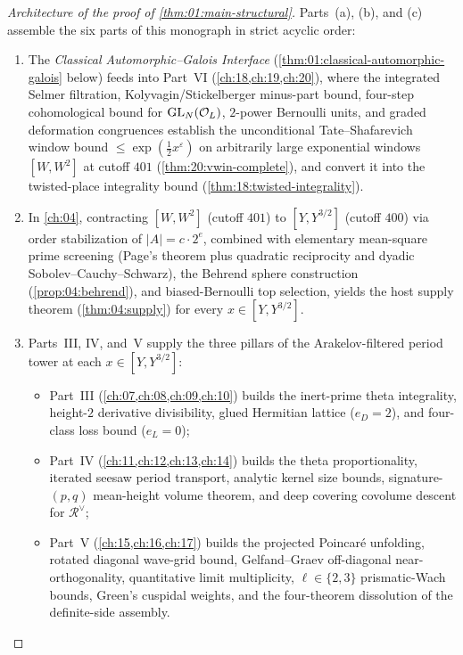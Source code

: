 \begin{proof}[Architecture of the proof of \cref{thm:01:main-structural}]
Parts~(a), (b), and (c) assemble the six parts of this monograph in strict acyclic order:
\begin{enumerate}[label=\textup{\arabic*.}]
\item The \emph{Classical Automorphic--Galois Interface} (\cref{thm:01:classical-automorphic-galois} below) feeds into Part~VI (\cref{ch:18,ch:19,ch:20}), where the integrated Selmer filtration, Kolyvagin/Stickelberger minus-part bound, four-step cohomological bound for $\mathrm{GL}_N(\mathcal{O}_L)$, $2$-power Bernoulli units, and graded deformation congruences establish the unconditional Tate--Shafarevich window bound $\le \exp(\frac{1}{2}x^\varepsilon)$ on arbitrarily large exponential windows $[W, W^2]$ at cutoff $401$ (\cref{thm:20:vwin-complete}), and convert it into the twisted-place integrality bound (\cref{thm:18:twisted-integrality}).
\item In \cref{ch:04}, contracting $[W, W^2]$ (cutoff $401$) to $[Y, Y^{3/2}]$ (cutoff $400$) via order stabilization of $|A| = c \cdot 2^e$, combined with elementary mean-square prime screening (Page's theorem plus quadratic reciprocity and dyadic Sobolev--Cauchy--Schwarz), the Behrend sphere construction (\cref{prop:04:behrend}), and biased-Bernoulli top selection, yields the host supply theorem (\cref{thm:04:supply}) for every $x \in [Y, Y^{3/2}]$.
\item Parts~III, IV, and~V supply the three pillars of the Arakelov-filtered period tower at each $x \in [Y, Y^{3/2}]$:
  \begin{itemize}
  \item Part~III (\cref{ch:07,ch:08,ch:09,ch:10}) builds the inert-prime theta integrality, height-$2$ derivative divisibility, glued Hermitian lattice ($e_D = 2$), and four-class loss bound ($e_L = 0$);
  \item Part~IV (\cref{ch:11,ch:12,ch:13,ch:14}) builds the theta proportionality, iterated seesaw period transport, analytic kernel size bounds, signature-$(p,q)$ mean-height volume theorem, and deep covering covolume descent for $\mathcal{R}^\vee$;
  \item Part~V (\cref{ch:15,ch:16,ch:17}) builds the projected Poincar\'e unfolding, rotated diagonal wave-grid bound, Gelfand--Graev off-diagonal near-orthogonality, quantitative limit multiplicity, $\ell \in \{2,3\}$ prismatic-Wach bounds, Green's cuspidal weights, and the four-theorem dissolution of the definite-side assembly.
  \end{itemize}

\end{enumerate}
\end{proof}
